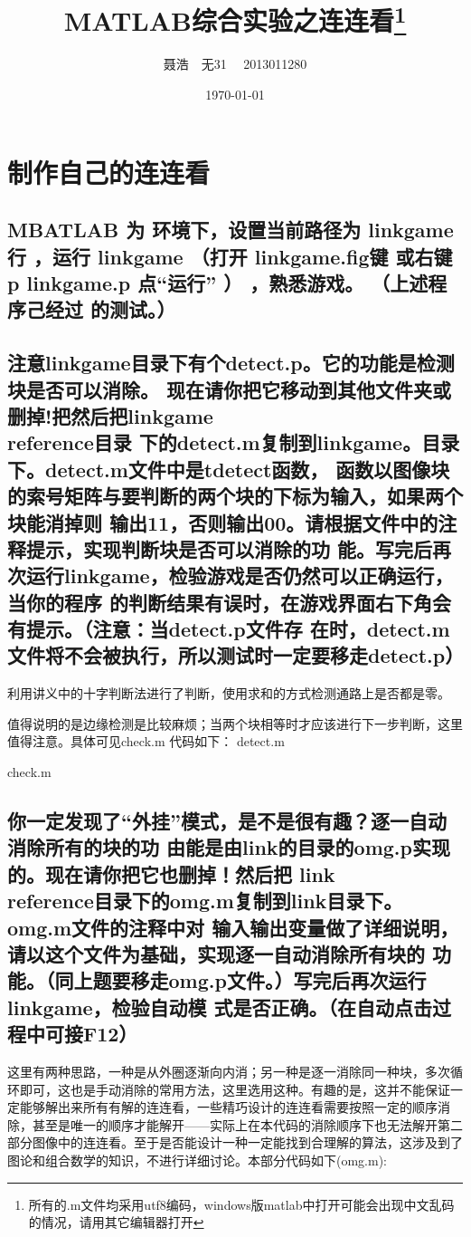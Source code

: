 \documentclass{ctexart}
\title{MATLAB综合实验之连连看\footnote{所有的.m文件均采用utf8编码，windows版matlab中打开可能会出现中文乱码的情况，请用其它编辑器打开}}
\author{聂浩~~无31~~ 2013011280}
\date{\today}
\begin{document}
\maketitle
\section{制作自己的连连看}
\subsection{
MBATLAB 为 环境下，设置当前路径为  linkgame行 ，运行  linkgame （打开
linkgame.fig键 或右键 p linkgame.p  点“运行” ） ，熟悉游戏。 （上述程序己经过
的测试。）}
\subsection{
注意linkgame目录下有个detect.p。它的功能是检测块是否可以消除。
现在请你把它移动到其他文件夹或删掉!把然后把linkgame\\reference目录
下的detect.m复制到linkgame。目录下。detect.m文件中是tdetect函数，
函数以图像块的索号矩阵与要判断的两个块的下标为输入，如果两个块能消掉则
输出11，否则输出00。请根据文件中的注释提示，实现判断块是否可以消除的功
能。写完后再次运行linkgame，检验游戏是否仍然可以正确运行，当你的程序
的判断结果有误时，在游戏界面右下角会有提示。（注意：当detect.p文件存
在时，detect.m文件将不会被执行，所以测试时一定要移走detect.p）}
利用讲义中的十字判断法进行了判断，使用求和的方式检测通路上是否都是零。

值得说明的是边缘检测是比较麻烦；当两个块相等时才应该进行下一步判断，这里值得注意。具体可见check.m
代码如下：
detect.m

check.m

\subsection{
你一定发现了“外挂”模式，是不是很有趣？逐一自动消除所有的块的功
由能是由link的目录的omg.p实现的。现在请你把它也删掉！然后把
link\\reference目录下的omg.m复制到link目录下。omg.m文件的注释中对
输入输出变量做了详细说明，请以这个文件为基础，实现逐一自动消除所有块的
功能。（同上题要移走omg.p文件。）写完后再次运行linkgame，检验自动模
式是否正确。（在自动点击过程中可接F12）
}
这里有两种思路，一种是从外圈逐渐向内消；另一种是逐一消除同一种块，多次循环即可，这也是手动消除的常用方法，这里选用这种。有趣的是，这并不能保证一定能够解出来所有有解的连连看，一些精巧设计的连连看需要按照一定的顺序消除，甚至是唯一的顺序才能解开——实际上在本代码的消除顺序下也无法解开第二部分图像中的连连看。至于是否能设计一种一定能找到合理解的算法，这涉及到了图论和组合数学的知识，不进行详细讨论。本部分代码如下(omg.m):

\end{document}
